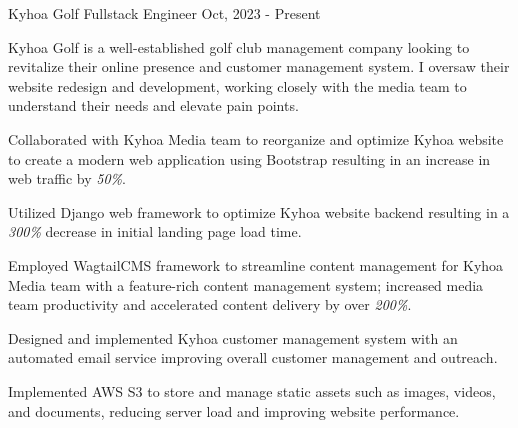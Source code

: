 \cventry
{Kyhoa Golf} %
{Fullstack Engineer} %
{ }
{Oct, 2023 - Present} %
{
	Kyhoa Golf is a well-established golf club management company looking to revitalize their online presence and customer management system.
	I oversaw their website redesign and development, working closely with the media team to understand their needs and elevate pain points.
	\begin{cvitemsdesc}
		\item {Collaborated with Kyhoa Media team to reorganize and optimize Kyhoa website to create a modern web application using Bootstrap resulting in an increase in web traffic by \emph{50\%}.}
		\item {Utilized Django web framework to optimize Kyhoa website backend resulting in a \emph{300\%} decrease in initial landing page load time.}
		\item {Employed WagtailCMS framework to streamline content management for Kyhoa Media team with a feature-rich content management system; increased media team productivity and accelerated content delivery by over \emph{200\%}.}
		\item {Designed and implemented Kyhoa customer management system with an automated email service improving overall customer management and outreach.}
		\item {Implemented AWS S3 to store and manage static assets such as images, videos, and documents, reducing server load and improving website performance.}
	\end{cvitemsdesc}
}
